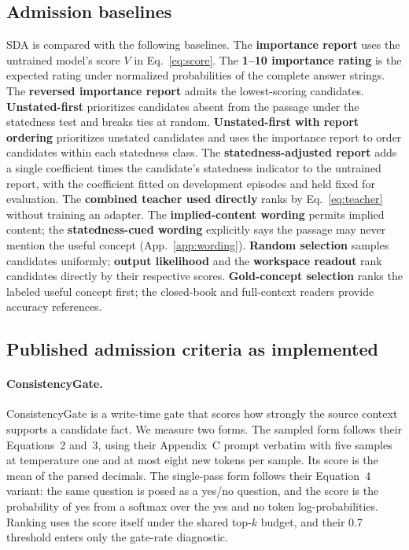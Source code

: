 \subsection{Admission baselines}
\label{app:baselines}

SDA is compared with the following baselines. The \textbf{importance
report} uses the untrained model's score $V$ in Eq.~\eqref{eq:score}.
The \textbf{1--10 importance rating} is the expected rating under
normalized probabilities of the complete answer strings.
The \textbf{reversed importance report} admits the lowest-scoring
candidates. \textbf{Unstated-first} prioritizes candidates absent from
the passage under the statedness test and breaks ties at random.
\textbf{Unstated-first with report ordering} prioritizes unstated
candidates and uses the importance report to order candidates within
each statedness class. The \textbf{statedness-adjusted report} adds a
single coefficient times the candidate's statedness indicator to the
untrained report, with the coefficient fitted on development episodes
and held fixed for evaluation. The \textbf{combined teacher used
directly} ranks by Eq.~\eqref{eq:teacher} without training an adapter.
The \textbf{implied-content wording} permits implied content; the
\textbf{statedness-cued wording} explicitly says the passage may never
mention the useful concept (App.~\ref{app:wording}).
\textbf{Random selection} samples candidates uniformly; \textbf{output
likelihood} and the \textbf{workspace readout} rank candidates directly
by their respective scores. \textbf{Gold-concept selection} ranks the
labeled useful concept first; the closed-book and full-context readers
provide accuracy references.

\subsection{Published admission criteria as implemented}
\label{app:publishedbaselines}

\paragraph{ConsistencyGate.}
ConsistencyGate \citep{consistencygate2026} is a write-time gate that
scores how strongly the source context supports a candidate fact. We
measure two forms. The sampled form follows their Equations~2 and~3,
using their Appendix~C prompt verbatim with five samples at temperature
one and at most eight new tokens per sample. Its score is the mean of
the parsed decimals. The single-pass form follows their Equation~4
variant: the same question is posed as a yes/no question, and the score
is the probability of yes from a softmax over the yes and no token
log-probabilities. Ranking uses the score itself under the shared
top-$k$ budget, and their 0.7 threshold enters only the gate-rate
diagnostic.

